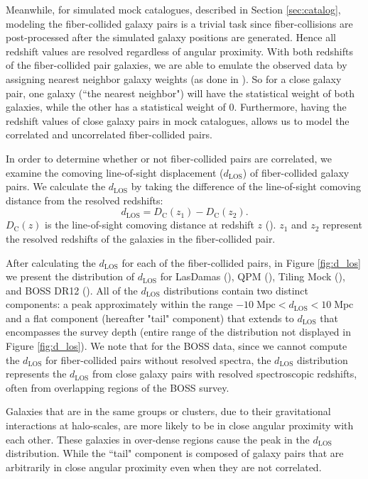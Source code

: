 \documentclass{emulateapj}
\begin{document}
Meanwhile, for simulated mock catalogues, described in Section \ref{sec:catalog}, modeling the fiber-collided galaxy pairs is a trivial task since fiber-collisions are post-processed after the simulated galaxy positions are generated. Hence all redshift values are resolved regardless of angular proximity. With both redshifts of the fiber-collided pair galaxies, we are able to emulate the observed data by assigning nearest neighbor galaxy weights (as done in \citealt{Anderson:2012aa}). So for a close galaxy pair, one galaxy (``the nearest neighbor") will have the statistical weight of both galaxies, while the other has a statistical weight of $0$. Furthermore, having the redshift values of close galaxy pairs in mock catalogues, allows us to model the correlated and uncorrelated fiber-collided pairs. 

In order to determine whether or not fiber-collided pairs are correlated, we examine the comoving line-of-sight displacement ($d_{\mathrm{LOS}}$) of fiber-collided galaxy pairs. We calculate the $d_{\mathrm{LOS}}$ by taking the difference of the line-of-sight comoving distance from the resolved redshifts: 
\begin{equation}
d_{\mathrm{LOS}} = D_{\mathrm{C}} (z_1) - D_{\mathrm{C}} (z_2). 
\end{equation}
$D_{\mathrm{C}}(z)$ is the line-of-sight comoving distance at redshift $z$ (\citealt{Hogg:1999aa}). $z_1$ and $z_2$ represent the resolved redshifts of the galaxies in the fiber-collided pair.

After calculating the $d_{\mathrm{LOS}}$ for each of the fiber-collided pairs, in Figure \ref{fig:d_los} we present the distribution of $d_{\mathrm{LOS}}$ for LasDamas (\ldgcolor), QPM (\qpmcolor), Tiling Mock (\tmcolor), and BOSS DR12 (\cmasscolor). All of the $d_{\mathrm{LOS}}$ distributions contain two distinct components: a peak approximately within the range $-10\;\mathrm{Mpc} < d_{\mathrm{LOS}} < 10\;\mathrm{Mpc}$ and a flat component (hereafter "tail" component) that extends to $d_{\mathrm{LOS}}$ that encompasses the survey depth (entire range of the distribution not displayed in Figure \ref{fig:d_los}). We note that for the BOSS data, since we cannot compute the $d_\mathrm{LOS}$ for fiber-collided pairs without resolved spectra, the $d_\mathrm{LOS}$ distribution represents the $d_\mathrm{LOS}$ from close galaxy pairs with resolved spectroscopic redshifts, often from overlapping regions of the BOSS survey.

Galaxies that are in the same groups or clusters, due to their gravitational interactions at halo-scales, are more likely to be in close angular proximity with each other. These galaxies in over-dense regions cause the peak in the $d_{\mathrm{LOS}}$ distribution. While the ``tail" component is composed of galaxy pairs that are arbitrarily in close angular proximity even when they are not correlated. 
\end{document}
